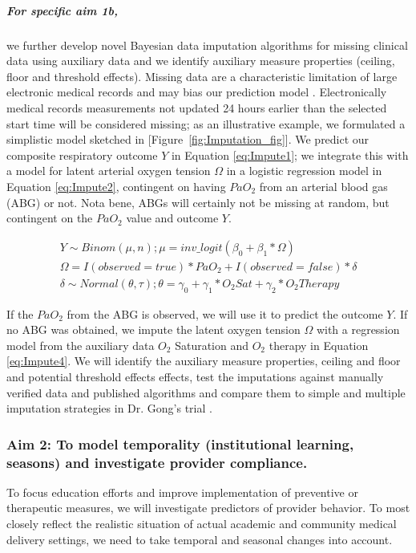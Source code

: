 \documentclass[11pt,notitlepage]{article}
\begin{document}
\subparagraph*{For specific aim 1b,} we further develop novel Bayesian data imputation algorithms for missing clinical data using auxiliary data and we identify auxiliary measure properties (ceiling, floor and threshold effects). Missing data are a characteristic limitation of large electronic medical records and may bias our prediction model \cite{Dean_19279318}. Electronically medical records measurements not updated 24 hours earlier than the selected start time will be considered missing;  as an illustrative example, we formulated a simplistic model sketched in [Figure~\ref{fig:Imputation_fig}]. We predict our composite respiratory outcome $Y$ in Equation \ref{eq:Impute1}; we integrate this with a model for latent arterial oxygen tension $\Omega$ in a logistic regression model in Equation \ref{eq:Impute2}, contingent on having $PaO_{2}$ from an arterial blood gas (ABG) or not. Nota bene, ABGs will certainly not be missing at random, but contingent on the $PaO_2$ value and outcome $Y$. 

\begin{figure} 
\vspace{-25pt}
\begin{align} \label{eq:Impute1}
Y \sim Binom(\mu, n); \mu = inv\_logit(\beta_{0} + \beta_{1} * \Omega) \\ \label{eq:Impute2}
\Omega =  I(observed = true) * PaO_{2}   +   I(observed = false) * \delta  \\ 
\delta \sim Normal(\theta, \tau); \theta = \gamma_{0} + \gamma_{1}* O_{2} Sat + \gamma_{2} * O_{2} Therapy \label{eq:Impute4}
\end{align}
\vspace{-35pt}
\end{figure}

\vspace{5pt} If the $PaO_{2}$ from the ABG is observed, we will use it to predict the outcome $Y$. If no ABG was obtained, we impute the latent oxygen tension $\Omega$ with a regression model from the auxiliary data  $O_{2}$ Saturation and $O_{2}$ therapy in Equation \ref{eq:Impute4}. We will identify the auxiliary measure properties, ceiling and floor and potential threshold effects effects, test the imputations against manually verified data and published algorithms and compare them to  simple and multiple imputation strategies in Dr. Gong's trial \cite{Huntington_16311133,Sloan_15027501}.  

\subsubsection*{Aim 2: To model temporality (institutional learning, seasons) and investigate provider compliance.}
To focus education efforts and improve implementation of preventive or therapeutic measures, we will investigate predictors of provider behavior. To most closely reflect the realistic situation of actual academic and community medical delivery settings, we need to take temporal and seasonal changes into account. 
  
\end{document}
